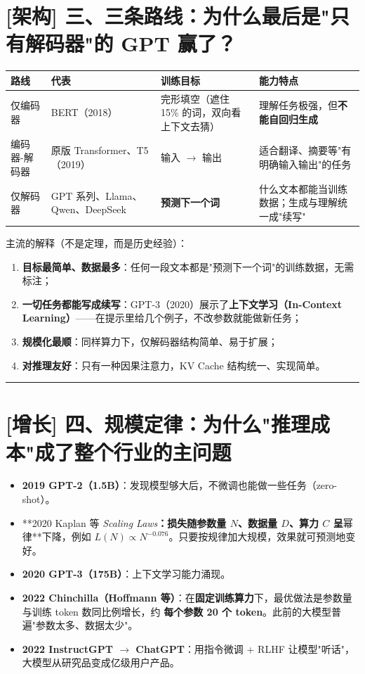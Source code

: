 \section{[架构] 三、三条路线：为什么最后是"只有解码器"的 GPT 赢了？}

\begin{center}
\small
\begin{tabularx}{\textwidth}{p{2.5cm} p{3.5cm} X X}
\toprule
\textbf{路线} & \textbf{代表} & \textbf{训练目标} & \textbf{能力特点} \\
\midrule
仅编码器 & BERT（2018） & 完形填空（遮住 15\% 的词，双向看上下文去猜） & 理解任务极强，但\textbf{不能自回归生成} \\
编码器-解码器 & 原版 Transformer、T5（2019） & 输入 $\rightarrow$ 输出 & 适合翻译、摘要等"有明确输入输出"的任务 \\
仅解码器 & GPT 系列、Llama、Qwen、DeepSeek & \textbf{预测下一个词} & 什么文本都能当训练数据；生成与理解统一成"续写" \\
\bottomrule
\end{tabularx}
\end{center}

主流的解释（不是定理，而是历史经验）：
\begin{enumerate}
  \item \textbf{目标最简单、数据最多}：任何一段文本都是"预测下一个词"的训练数据，无需标注；
  \item \textbf{一切任务都能写成续写}：GPT-3（2020）展示了\textbf{上下文学习（In-Context Learning）}——在提示里给几个例子，不改参数就能做新任务；
  \item \textbf{规模化最顺}：同样算力下，仅解码器结构简单、易于扩展；
  \item \textbf{对推理友好}：只有一种因果注意力，KV Cache 结构统一、实现简单。
\end{enumerate}

\vspace{0.8em}\hrule\vspace{0.8em}

\section{[增长] 四、规模定律：为什么"推理成本"成了整个行业的主问题}

\begin{itemize}
  \item \textbf{2019 GPT-2（1.5B）}：发现模型够大后，不微调也能做一些任务（zero-shot）。
  \item **2020 Kaplan 等 \textit{Scaling Laws}\textbf{：损失随参数量 $N$、数据量 $D$、算力 $C$ 呈}幂律**下降，例如 $L(N) \propto N^{-0.076}$。只要按规律加大规模，效果就可预测地变好。
  \item \textbf{2020 GPT-3（175B）}：上下文学习能力涌现。
  \item \textbf{2022 Chinchilla（Hoffmann 等）}：在\textbf{固定训练算力}下，最优做法是参数量与训练 token 数同比例增长，约 \textbf{每个参数 20 个 token}。此前的大模型普遍"参数太多、数据太少"。
  \item \textbf{2022 InstructGPT $\rightarrow$ ChatGPT}：用指令微调 + RLHF 让模型"听话"，大模型从研究品变成亿级用户产品。
\end{itemize}

